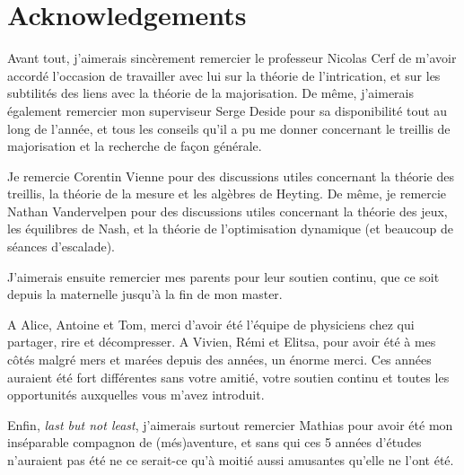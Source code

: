 \section*{Acknowledgements}

Avant tout, j'aimerais sincèrement remercier le professeur Nicolas Cerf de m'avoir accordé l'occasion de travailler avec lui sur la théorie de l'intrication, et sur les subtilités des liens avec la théorie de la majorisation. De même, j'aimerais également remercier mon superviseur Serge Deside pour sa disponibilité tout au long de l'année, et tous les conseils qu'il a pu me donner concernant le treillis de majorisation et la recherche de façon générale.

Je remercie Corentin Vienne pour des discussions utiles concernant la théorie des treillis, la théorie de la mesure et les algèbres de Heyting. De même, je remercie Nathan Vandervelpen pour des discussions utiles concernant la théorie des jeux, les équilibres de Nash, et la théorie de l'optimisation dynamique (et beaucoup de séances d'escalade).

J'aimerais ensuite remercier mes parents pour leur soutien continu, que ce soit depuis la maternelle jusqu'à la fin de mon master.

A Alice, Antoine et Tom, merci d'avoir été l'équipe de physiciens chez qui partager, rire et décompresser. A Vivien, Rémi et Elitsa, pour avoir été à mes côtés malgré mers et marées depuis des années, un énorme merci. Ces années auraient été fort différentes sans votre amitié, votre soutien continu et toutes les opportunités auxquelles vous m'avez introduit.

Enfin, \textit{last but not least}, j'aimerais surtout remercier Mathias pour avoir été mon inséparable compagnon de (més)aventure, et sans qui ces 5 années d'études n'auraient pas été ne ce serait-ce qu'à moitié aussi amusantes qu'elle ne l'ont été.

